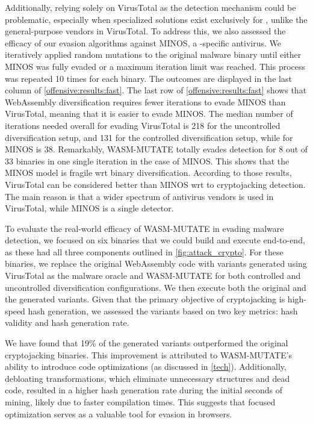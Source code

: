 Additionally, relying solely on VirusTotal as the detection mechanism could be problematic, especially when specialized solutions exist exclusively for \Wasm, unlike the general-purpose vendors in VirusTotal. 
To address this, we also assessed the efficacy of our evasion algorithms against MINOS, a \Wasm-specific antivirus. 
We iteratively applied random mutations to the original malware binary until either MINOS was fully evaded or a maximum iteration limit was reached. 
This process was repeated 10 times for each binary. 
The outcomes are displayed in the last column of \autoref{offensive:results:fast}.
The last row of \autoref{offensive:results:fast} shows that WebAssembly diversification requires fewer iterations to evade MINOS than VirusTotal, meaning that it is easier to evade MINOS.
The median number of iterations needed overall for evading VirusTotal is 218 for the uncontrolled diversification setup, and 131 for the controlled diversification setup, while for MINOS is 38.
Remarkably, WASM-MUTATE totally evades detection for 8 out of 33 binaries in one single iteration in the case of MINOS.
This shows that the MINOS model is fragile wrt binary diversification. 
According to those results, VirusTotal can be considered better than MINOS wrt to cryptojacking detection. 
The main reason is that a wider spectrum of antivirus vendors is used in VirusTotal, while MINOS is a single detector.


 To evaluate the real-world efficacy of WASM-MUTATE in evading malware detection, we focused on six binaries that we could build and execute end-to-end, as these had all three components outlined in \autoref{fig:attack_crypto}. 
For these binaries, we replace the original WebAssembly code with variants generated using VirusTotal as the malware oracle and WASM-MUTATE for both controlled and uncontrolled diversification configurations. 
We then execute both the original and the generated variants. 
Given that the primary objective of cryptojacking is high-speed hash generation, we assessed the variants based on two key metrics: hash validity and hash generation rate.

We have found that 19\% of the generated variants outperformed the original cryptojacking binaries. 
This improvement is attributed to WASM-MUTATE's ability to introduce code optimizations (as discussed in \autoref{tech}). 
Additionally, debloating transformations, which eliminate unnecessary structures and dead code, resulted in a higher hash generation rate during the initial seconds of mining, likely due to faster compilation times. 
This suggests that focused optimization serves as a valuable tool for evasion in browsers.

